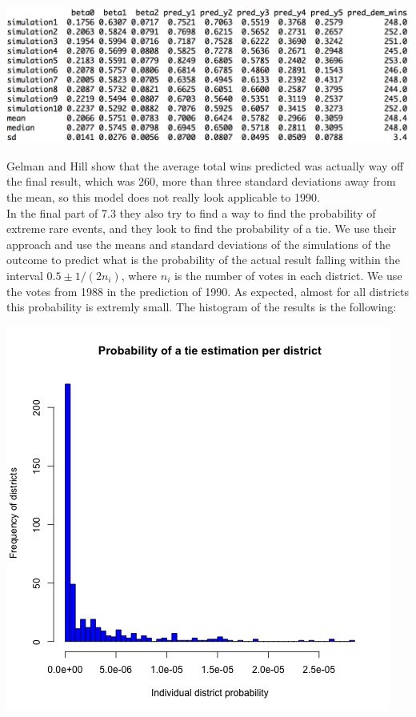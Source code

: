 \documentclass[a4paper, 11pt]{article}
\begin{document}
\begin{center}
\includegraphics[scale=0.7]{plot_ex4_5.png}
\end{center}
Gelman and Hill show that the average total wins predicted was actually way off the final result, which was 260, more than three standard deviations away from the mean, so this model does not really look applicable to 1990.\\
\newline In the final part of 7.3 they also try to find a way to find the probability of extreme rare events, and they look to find the probability of a tie. We use their approach and use the means and standard deviations of the simulations of the outcome to predict what is the probability of the actual result falling within the interval $0.5 \pm 1 / (2 n_i)$, where $n_i$ is the number of votes in each district. We use the votes from 1988 in the prediction of 1990. As expected, almost for all districts this probability is extremly small. The histogram of the results is the following:
\begin{center}
\includegraphics[scale=0.7]{plot_ex4_6.png}
\end{center}
\end{document}
